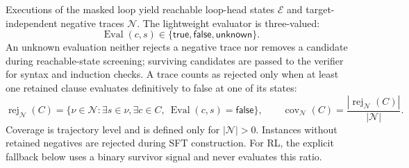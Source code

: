 Executions of the masked loop yield reachable loop-head states \(\mathcal E\)
and target-independent negative traces \(\mathcal N\).  The lightweight
evaluator is three-valued:
\begin{equation}
  \operatorname{Eval}(c,s)\in
  \{\mathsf{true},\mathsf{false},\mathsf{unknown}\}.
  \label{eq:formal-state-eval}
\end{equation}
An unknown evaluation neither rejects a negative trace nor removes a
candidate during reachable-state screening; surviving candidates are passed
to the verifier for syntax and induction checks.
A trace counts as rejected only when at least one retained clause evaluates
definitively to false at one of its states:
\begin{equation}
  \operatorname{rej}_{\mathcal N}(C)
  =\{\nu\in\mathcal N:\exists s\in\nu,\exists c\in C,\
    \operatorname{Eval}(c,s)=\mathsf{false}\},
  \qquad
  \operatorname{cov}_{\mathcal N}(C)
  =\frac{|\operatorname{rej}_{\mathcal N}(C)|}{|\mathcal N|}.
  \label{eq:formal-coverage}
\end{equation}
Coverage is trajectory level and is defined only for
\(|\mathcal N|>0\).  Instances without retained negatives are rejected during
SFT construction.  For RL, the explicit fallback below uses a binary survivor
signal and never evaluates this ratio.

